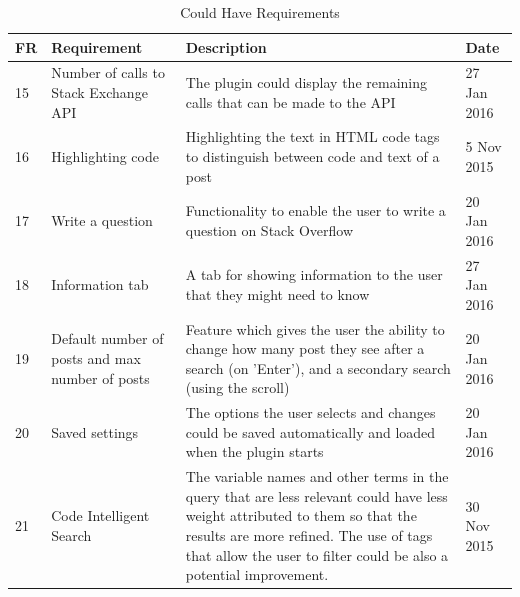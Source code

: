 \documentclass{l4proj}
\begin{document}
\begin{table}[H]
\caption{Could Have Requirements}
\centering
\def\arraystretch{1.5}
\begin{tabular}{p{0.5cm}p{4cm}p{9cm}p{2cm}}
\hline
FR & Requirement & Description & Date \\
\hline
15 & Number of calls to Stack Exchange API & The plugin could display the remaining calls that can be made to the API & 27 Jan 2016\\
16 & Highlighting code & Highlighting the text in HTML code tags to distinguish between code and text of a post & 5 Nov 2015\\
17 & Write a question & Functionality to enable the user to write a question on Stack Overflow & 20 Jan 2016\\
18 & Information tab & A tab for showing information to the user that they might need to know & 27 Jan 2016\\
19 & Default number of posts and max number of posts & Feature which gives the user the ability to change how many post they see after a search (on 'Enter'), and a secondary search (using the scroll) & 20 Jan 2016\\
20 & Saved settings & The options the user selects and changes could be saved automatically and loaded when the plugin starts & 20 Jan 2016\\
21 & Code Intelligent Search & The variable names and other terms in the query that are less relevant could have less weight attributed to them so that the results are more refined. The use of tags that allow the user to filter could be also a potential improvement. & 30 Nov 2015\\
\hline
\end{tabular}
\label{table:couldTable}
\end{table}

\newpage
\end{document}
